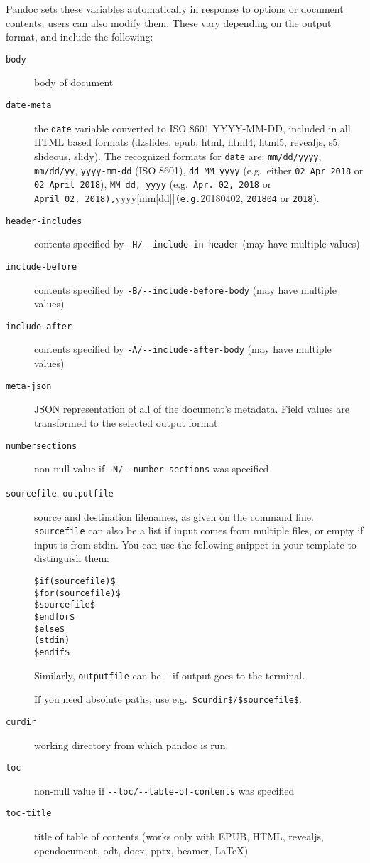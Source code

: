\documentclass[
]{article}
\begin{document}
Pandoc sets these variables automatically in response to
\hyperref[options]{options} or document contents; users can also modify
them. These vary depending on the output format, and include the
following:

\begin{description}
\item[\texttt{body}]
body of document
\item[\texttt{date-meta}]
the \texttt{date} variable converted to ISO 8601 YYYY-MM-DD, included in
all HTML based formats (dzslides, epub, html, html4, html5, revealjs,
s5, slideous, slidy). The recognized formats for \texttt{date} are:
\texttt{mm/dd/yyyy}, \texttt{mm/dd/yy}, \texttt{yyyy-mm-dd} (ISO 8601),
\texttt{dd\ MM\ yyyy} (e.g.~either \texttt{02\ Apr\ 2018} or
\texttt{02\ April\ 2018}), \texttt{MM\ dd,\ yyyy}
(e.g.~\texttt{Apr.\ 02,\ 2018} or
\texttt{April\ 02,\ 2018),}yyyy{[}mm{[}dd{]}{]}\texttt{(e.g.}20180402,
\texttt{201804} or \texttt{2018}).
\item[\texttt{header-includes}]
contents specified by \texttt{-H/-\/-include-in-header} (may have
multiple values)
\item[\texttt{include-before}]
contents specified by \texttt{-B/-\/-include-before-body} (may have
multiple values)
\item[\texttt{include-after}]
contents specified by \texttt{-A/-\/-include-after-body} (may have
multiple values)
\item[\texttt{meta-json}]
JSON representation of all of the document's metadata. Field values are
transformed to the selected output format.
\item[\texttt{numbersections}]
non-null value if \texttt{-N/-\/-number-sections} was specified
\item[\texttt{sourcefile}, \texttt{outputfile}]
source and destination filenames, as given on the command line.
\texttt{sourcefile} can also be a list if input comes from multiple
files, or empty if input is from stdin. You can use the following
snippet in your template to distinguish them:

\begin{verbatim}
$if(sourcefile)$
$for(sourcefile)$
$sourcefile$
$endfor$
$else$
(stdin)
$endif$
\end{verbatim}

Similarly, \texttt{outputfile} can be \texttt{-} if output goes to the
terminal.

If you need absolute paths, use e.g.~\texttt{\$curdir\$/\$sourcefile\$}.
\item[\texttt{curdir}]
working directory from which pandoc is run.
\item[\texttt{toc}]
non-null value if \texttt{-\/-toc/-\/-table-of-contents} was specified
\item[\texttt{toc-title}]
title of table of contents (works only with EPUB, HTML, revealjs,
opendocument, odt, docx, pptx, beamer, LaTeX)
\end{description}
\end{document}
